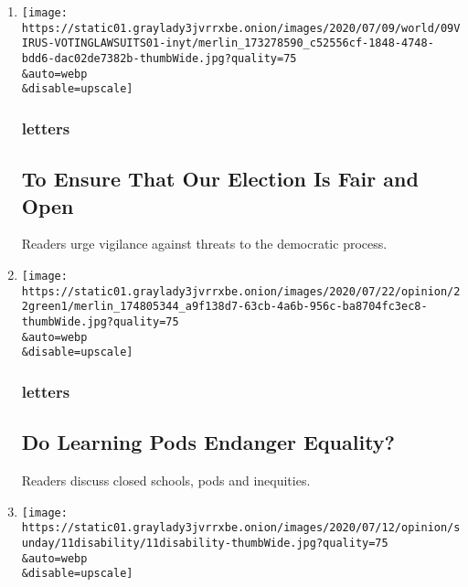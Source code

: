 \begin{enumerate}
\def\labelenumi{\arabic{enumi}.}
\item
  \href{/2020/08/02/opinion/letters/voting-election.html}{}

  \texttt{[image: https://static01.graylady3jvrrxbe.onion/images/2020/07/09/world/09VIRUS-VOTINGLAWSUITS01-inyt/merlin\_173278590\_c52556cf-1848-4748-bdd6-dac02de7382b-thumbWide.jpg?quality=75\\\&auto=webp\\\&disable=upscale]}

  \hypertarget{letters}{%
  \subsubsection{letters}\label{letters}}

  \hypertarget{to-ensure-that-our-election-is-fair-and-open}{%
  \subsection{To Ensure That Our Election Is Fair and
  Open}\label{to-ensure-that-our-election-is-fair-and-open}}

  Readers urge vigilance against threats to the democratic process.
\item
  \href{/2020/08/02/opinion/letters/virus-education.html}{}

  \texttt{[image: https://static01.graylady3jvrrxbe.onion/images/2020/07/22/opinion/22green1/merlin\_174805344\_a9f138d7-63cb-4a6b-956c-ba8704fc3ec8-thumbWide.jpg?quality=75\\\&auto=webp\\\&disable=upscale]}

  \hypertarget{letters-1}{%
  \subsubsection{letters}\label{letters-1}}

  \hypertarget{do-learning-pods-endanger-equality}{%
  \subsection{Do Learning Pods Endanger
  Equality?}\label{do-learning-pods-endanger-equality}}

  Readers discuss closed schools, pods and inequities.
\item
  \href{/2020/08/01/opinion/letters/disability-law.html}{}

  \texttt{[image: https://static01.graylady3jvrrxbe.onion/images/2020/07/12/opinion/sunday/11disability/11disability-thumbWide.jpg?quality=75\\\&auto=webp\\\&disable=upscale]}


\end{enumerate}
